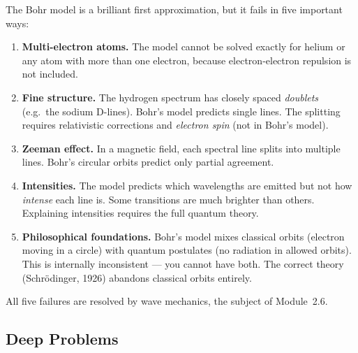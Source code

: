 \documentclass[12pt, a4paper]{book}
\begin{document}
\begin{modelbreaks}
The Bohr model is a brilliant first approximation, but it fails
in five important ways:

\begin{enumerate}[nosep, leftmargin=2em]
  \item \textbf{Multi-electron atoms.} The model cannot be solved
        exactly for helium or any atom with more than one electron,
        because electron-electron repulsion is not included.

  \item \textbf{Fine structure.} The hydrogen spectrum has closely
        spaced \emph{doublets} (e.g.\ the sodium D-lines).
        Bohr's model predicts single lines.
        The splitting requires relativistic corrections and
        \emph{electron spin} (not in Bohr's model).

  \item \textbf{Zeeman effect.} In a magnetic field, each spectral
        line splits into multiple lines.
        Bohr's circular orbits predict only partial agreement.

  \item \textbf{Intensities.} The model predicts which wavelengths
        are emitted but not how \emph{intense} each line is.
        Some transitions are much brighter than others.
        Explaining intensities requires the full quantum theory.

  \item \textbf{Philosophical foundations.} Bohr's model mixes
        classical orbits (electron moving in a circle)
        with quantum postulates (no radiation in allowed orbits).
        This is internally inconsistent --- you cannot have both.
        The correct theory (Schr\"{o}dinger, 1926) abandons
        classical orbits entirely.
\end{enumerate}

All five failures are resolved by wave mechanics, the subject
of Module~2.6.
\end{modelbreaks}

\subsection*{Deep Problems}
\end{document}
